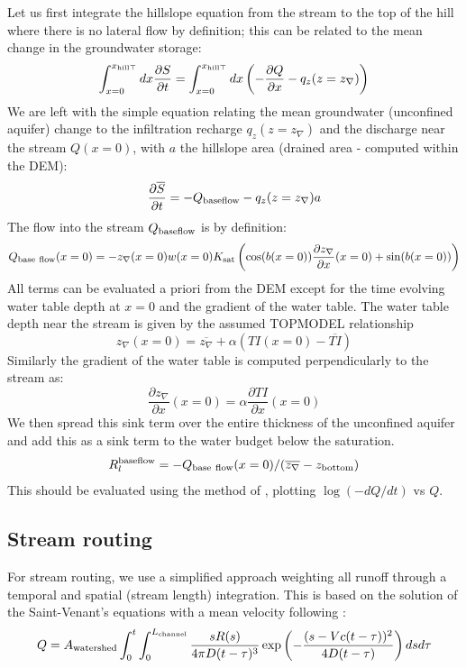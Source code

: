\documentclass[twoside,10pt]{report}
\begin{document}
Let us first integrate the hillslope equation from the stream to the top of the hill where there is no lateral flow by definition; this can be related to the mean change in the groundwater storage:
\begin{equation}
    \int_{x=0}^{x_{\rm hill \top}}dx \frac{\partial S}{\partial t} =\int_{x=0}^{x_{\rm hill \top}}dx \left( -\frac{\partial Q}{\partial x} - q_z(z=z_{\nabla}) \right)
\end{equation}
We are left with the simple equation relating the mean groundwater (unconfined aquifer) change to the infiltration recharge $q_z(z=z_{\nabla})$ and the discharge near the stream $Q(x=0)$, with $a$ the hillslope area (drained area - computed within the DEM):
\begin{equation}
    \frac{\partial \overline{S}}{\partial t} = -Q_{\rm baseflow}- q_z(z=z_{\nabla})a 
\end{equation}
The flow into the stream $Q_{\rm baseflow}$ is by definition:
\begin{equation}
    Q_{\rm base \ flow}(x=0) = - z_{\nabla}(x=0) w(x=0) K_{\rm sat} \left( \cos(b(x=0))\frac{\partial z_{\nabla}}{\partial x}(x=0) + \sin(b(x=0))  \right)
\end{equation}
All terms can be evaluated a priori from the DEM except for the time evolving water  table depth at $x=0$ and the gradient of the water table.
The water table depth near the stream is given by the assumed TOPMODEL relationship \begin{equation}
    z_{\nabla}(x=0) = \overline{z_{\nabla}} +  \alpha (TI(x=0)-\overline{TI})
\end{equation}
Similarly the gradient of the water table is computed perpendicularly to the stream as:
\begin{equation}
    \frac{\partial z_{\nabla}}{\partial x}(x=0) =  \alpha \frac{\partial TI}{\partial x}(x=0)
\end{equation}
We then spread this sink term over the entire thickness of the unconfined aquifer and add this as a sink term to the water budget below the saturation.
\begin{equation}
    R_l^{\rm baseflow } = - Q_{\rm base \ flow}(x=0)/(\overline{z_{\nabla}}-z_{\rm bottom}) 
\end{equation}
This should be evaluated using the method of \citep{Brutsaert1977}, plotting $\log(-dQ/dt)$ vs $Q$.

\subsection{Stream routing}
For stream routing, we use a simplified approach weighting all runoff through a temporal and spatial (stream length) integration. This is based on the solution of the Saint-Venant's equations with a mean velocity following \citet{Mesa1986,Rinaldo1991,Dodorico2003}:
\begin{equation}
    Q = A_{\rm watershed} \int_0^{t}\int_0^{L_{\rm channel}} \frac{s R(s)}{4 \pi D (t-\tau)^3} \exp \left(  - \frac{(s-Vc(t-\tau))^2}{4D(t-\tau)}  \right)  ds d\tau
\end{equation}
\end{document}
